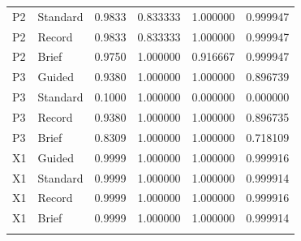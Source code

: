 \begin{longtable}{@{}llrrrr@{}}
P2 & Standard & 0.9833 & 0.833333 & 1.000000 & 0.999947 \\
P2 & Record & 0.9833 & 0.833333 & 1.000000 & 0.999947 \\
P2 & Brief & 0.9750 & 1.000000 & 0.916667 & 0.999947 \\
\addlinespace[3pt]
P3 & Guided & 0.9380 & 1.000000 & 1.000000 & 0.896739 \\
P3 & Standard & 0.1000 & 1.000000 & 0.000000 & 0.000000 \\
P3 & Record & 0.9380 & 1.000000 & 1.000000 & 0.896735 \\
P3 & Brief & 0.8309 & 1.000000 & 1.000000 & 0.718109 \\
\addlinespace[3pt]
X1 & Guided & 0.9999 & 1.000000 & 1.000000 & 0.999916 \\
X1 & Standard & 0.9999 & 1.000000 & 1.000000 & 0.999914 \\
X1 & Record & 0.9999 & 1.000000 & 1.000000 & 0.999916 \\
X1 & Brief & 0.9999 & 1.000000 & 1.000000 & 0.999914 \\
\addlinespace[3pt]
\end{longtable}
\endgroup
